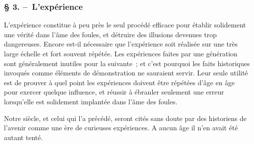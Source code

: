 \documentclass[french,twoside]{book} %
\begin{document}
\subsubsection[{§ 3. – L’expérience}]{§ 3. – L’expérience}
\noindent L’expérience constitue à peu près le seul procédé efficace pour établir solidement une vérité dans l’âme des foules, et détruire des illusions devenues trop dangereuses. Encore est-il nécessaire que l’expérience soit réalisée sur une très large échelle et fort souvent répétée. Les expériences faites par une génération sont généralement inutiles pour la suivante ; et c’est pour­quoi les faits historiques invoqués comme éléments de démonstration ne sauraient servir. Leur seule utilité est de prouver à quel point les expériences doivent être répétées d’âge en âge pour exercer quelque influence, et réussir à ébranler seulement une erreur lorsqu’elle est solidement implantée dans l’âme des foules.\par
Notre siècle, et celui qui l’a précédé, seront cités sans doute par des historiens de l’avenir comme une ère de curieuses expériences. A aucun âge il n’en avait été autant tenté.\par
\end{document}
